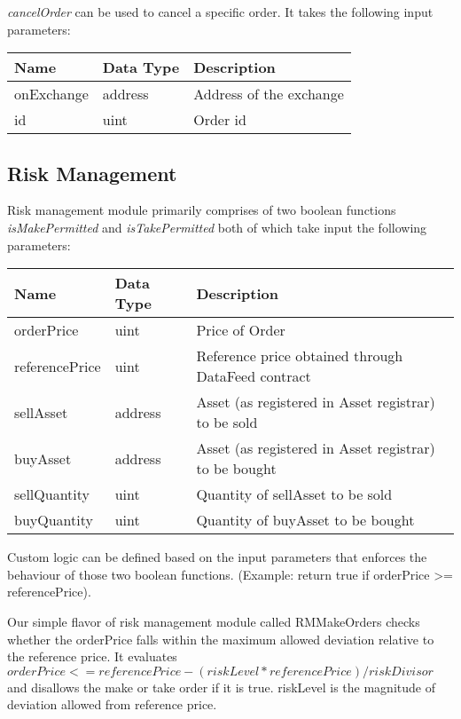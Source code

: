 \documentclass[conference]{IEEEtran}
\begin{document}
\textit{cancelOrder} can be used to cancel a specific order. It takes the following input parameters:
\begin{center}
	\footnotesize
	\begin{tabular}{ | p{2.7cm} | p{0.8cm} | p{4cm} | }
		\hline
		Name & Data Type & Description \\ \hline
		onExchange & address & Address of the exchange \\ \hline
		id & uint & Order id \\ \hline
	\end{tabular}
\end{center}

\subsection{Risk Management}

Risk management module primarily comprises of two boolean functions \textit{isMakePermitted} and \textit{isTakePermitted} both of which take input the following parameters:

\begin{center}
	\footnotesize
	\begin{tabular}{ | p{2.7cm} | p{0.8cm} | p{4cm} | }
		\hline
		Name & Data Type & Description \\ \hline
		orderPrice & uint & Price of Order \\ \hline
		referencePrice & uint &  Reference price obtained through DataFeed contract \\ \hline
		sellAsset & address & Asset (as registered in Asset registrar) to be sold \\ \hline
		buyAsset & address & Asset (as registered in Asset registrar) to be bought \\ \hline
		sellQuantity & uint & Quantity of sellAsset to be sold \\ \hline
		buyQuantity & uint & Quantity of buyAsset to be bought \\ \hline
	\end{tabular}
\end{center}

Custom logic can be defined based on the input parameters that enforces the behaviour of those two boolean functions. (Example: return true if orderPrice >= referencePrice). 

Our simple flavor of risk management module called RMMakeOrders checks whether the orderPrice falls within the maximum allowed deviation relative to the reference price. It evaluates $orderPrice <= referencePrice - (riskLevel  * referencePrice) / riskDivisor$ and disallows the make or take order if it is true. riskLevel is the magnitude of deviation allowed from reference price. 
\end{document}
